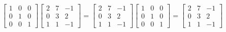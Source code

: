 \begin{applicationActivities}{2}{22}
\begin{fact}
  \[
    \begin{bmatrix} 1 & 0 & 0 \\ 0 & 1 & 0 \\ 0 & 0 & 1 \end{bmatrix}
    \begin{bmatrix} 2 & 7 & -1 \\ 0 & 3 & 2 \\ 1 & 1 & -1 \end{bmatrix}
  =
    \begin{bmatrix} 2 & 7 & -1 \\ 0 & 3 & 2 \\ 1 & 1 & -1 \end{bmatrix}
      \begin{bmatrix} 1 & 0 & 0 \\ 0 & 1 & 0 \\ 0 & 0 & 1 \end{bmatrix}
  =
    \begin{bmatrix} 2 & 7 & -1 \\ 0 & 3 & 2 \\ 1 & 1 & -1 \end{bmatrix}
  \]
\end{fact}


\end{applicationActivities}
